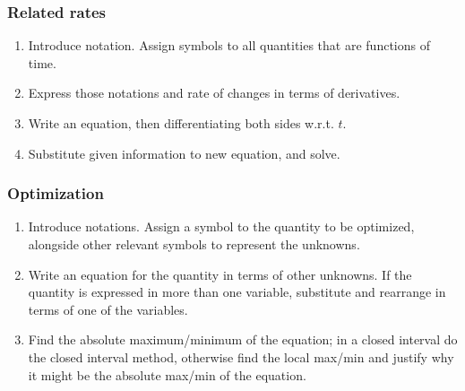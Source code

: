 \documentclass[main.tex]{subfiles}
\begin{document}
\begin{multicols}{2}
	\subsubsection*{Related rates}
	\begin{enumerate}
		\item Introduce notation. Assign symbols to all quantities that are functions of time.
		\item Express those notations and rate of changes in terms of derivatives.
		\item Write an equation, then differentiating both sides w.r.t. \(t\).
		\item Substitute given information to new equation, and solve.
	\end{enumerate}

	\subsubsection*{Optimization}
	\begin{enumerate}
		\item Introduce notations. Assign a symbol to the quantity to be optimized, alongside other relevant symbols to represent the unknowns.
		\item Write an equation for the quantity in terms of other unknowns. If the quantity is expressed in more than one variable, substitute and rearrange in terms of one of the variables.
		\item Find the absolute maximum/minimum of the equation; in a closed interval do the closed interval method, otherwise find the local max/min and justify why it might be the absolute max/min of the equation.
	\end{enumerate}


\end{multicols}
\end{document}
